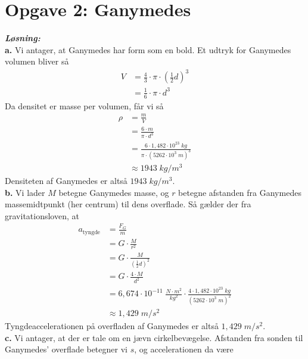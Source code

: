 \documentclass{report}
\newcommand{\sol}{\setlength{\parindent}{0cm}\textbf{\textit{Løsning:}}\setlength{\parindent}{1cm}}
\begin{document}
\section*{Opgave 2: Ganymedes}
\sol \\
\textbf{a.}
Vi antager, at Ganymedes har form som en bold.
Et udtryk for Ganymedes volumen bliver så 
\begin{equation*}
\begin{split}
  V&=\frac{4}{3} \cdot \pi  \cdot \left(\frac{1}{2} d\right)^{3}\\
  &=\frac{1}{6} \cdot \pi \cdot d^3
\end{split}
\end{equation*}
Da densitet er masse per volumen, får vi så
\begin{equation*}
\begin{split}
  \rho &=\frac{m}{V}\\
  &=\frac{6 \cdot m}{ \pi \cdot  d ^3}\\
  &=\frac{6 \cdot 1,482 \cdot 10 ^{23} \;\unit{kg} }{ \pi \cdot \left(5262 \cdot 10^3 \;\unit{m} \right) ^3 }\\
  &\approx 1943 \;\unit{kg/m^3} 
\end{split}
\end{equation*}
Densiteten af Ganymedes er altså $1943 \;\unit{kg/m^3} $.\\[1ex]
\textbf{b.}
Vi lader $M$ betegne Ganymedes masse, og $r$ betegne afstanden fra Ganymedes massemidtpunkt (her centrum) til dens overflade.
Så gælder der fra gravitationsloven, at 
\begin{equation*}
\begin{split}
  a _{\text{tyngde} }&=\frac{F _{G}}{m}\\
  &=G \cdot \frac{M}{r^2}\\
  &=G \cdot \frac{M}{\left(\frac{1}{2}d\right) ^2}\\
  &=G \cdot \frac{4 \cdot M}{d^2}\\
  &=6,674 \cdot 10 ^{-11} \;\unit{\frac{N \cdot m^2}{kg^2}} \cdot \frac{4 \cdot 1,482 \cdot 10 ^{23}\;\unit{kg} }{\left(5262 \cdot 10^3 \;\unit{m} \right) ^2}\\
  &\approx 1,429 \;\unit{m/s^2} 
\end{split}
\end{equation*}
Tyngdeaccelerationen på overfladen af Ganymedes er altså $1,429 \;\unit{m/s^2} $.\\[1ex]
\textbf{c.}
Vi antager, at der er tale om en jævn cirkelbevægelse.
Afstanden fra sonden til Ganymedes' overflade betegner vi $s$, og accelerationen da være
\end{document}
